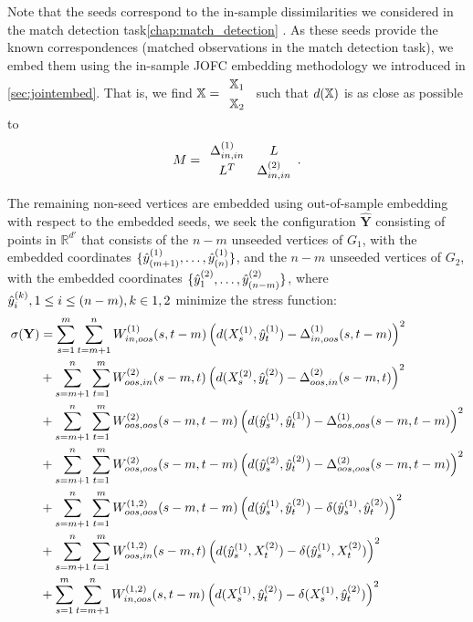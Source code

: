 \documentclass[12pt,oneside,final]{thesis}\usepackage[]{graphicx}\usepackage[]{color}
\begin{document}
Note that the seeds correspond to the in-sample dissimilarities we considered in the match detection task\ref{chap:match_detection} . As these seeds provide the known correspondences (matched observations in the match detection task), we embed them using the in-sample JOFC embedding methodology we introduced in \ref{sec:jointembed}. That is, we find $\X= \begin{array}{c}
\X_1 \\
\X_2
\end{array}$ such that $d(\mathbb{X})$ is as close as possible to $$M= \begin{array}{cc}
\gD^{(1)}_{in,in} & L \\
 L^T &\gD^{(2)}_{in,in}
\end{array} . $$

The remaining non-seed vertices are embedded using out-of-sample embedding with respect to the embedded seeds, \ie we seek the configuration ${ \hat{\mathbf{Y}}}$ consisting of points in $\mathbb{R}^{d'}$ that consists of the $n-m$ unseeded vertices of $G_1$, with the embedded coordinates  $\{\hat{y}^{(1)}_{(m+1)},\ldots,\hat{y}^{(1)}_{(n)}\}$, and the $n-m$ unseeded vertices of $G_2$, with the embedded coordinates  $\{\hat{y}^{(2)}_1,\ldots,\hat{y}^{(2)}_{(n-m)}\}$, where $\yhat_{i}^{(k)}, \onespace 1\leq i \leq (n-m), k \in {1,2}$  minimize the stress function:
\begin{align}
\sigma({\bf Y})&=\sum_{s=1}^{m}\sum_{t=m+1}^{n} {W^{(1)}_{in,oos}(s,t-m)  \left(d(X^{(1)}_{s},\hat{y}_t^{(1)})-{\Delta}^{(1)}_{in,oos}(s,t-m)\right)^2 } \label{eq:oos}\\
&+\sum_{s=m+1}^{n}\sum_{t=1}^{m}
{W^{(2)}_{oos,in}(s-m,t)  \left(d(X^{(2)}_{s},\hat{y}_t^{(2)})-{\Delta}^{(2)}_{oos,in}(s-m,t)\right)^2}  \label{eq:oos2}\\
&+\sum_{s=m+1}^{n}\sum_{t=1}^{m} 
{W^{(2)}_{oos,oos}(s-m,t-m) \left(d(\hat{y}_s^{(1)},\hat{y}_t^{(1)})-{\Delta}^{(1)}_{oos,oos}(s-m,t-m)\right)^2} \label{eq:oos3}\\
&+\sum_{s=m+1}^{n}\sum_{t=1}^{m} 
{W^{(2)}_{oos,oos}(s-m,t-m) \left(d(\hat{y}_s^{(2)},\hat{y}_t^{(2)})-{\Delta}^{(2)}_{oos,oos}(s-m,t-m)\right)^2} \label{eq:oos4} \\
&+\sum_{s=m+1}^{n} \sum_{t=1}^{m}
W^{(1,2)}_{oos,oos}(s-m,t-m) \left(d(\hat{y}_s^{(1)},\hat{y}_t^{(2)})-\delta(\hat{y}_s^{(1)},\hat{y}_t^{(2)})\right)^2 \label{eq:oos5}\\
&+\sum_{s=m+1}^{n} \sum_{t=1}^{m}
W^{(1,2)}_{oos,in}(s-m,t) \left(d(\hat{y}_s^{(1)},X^{(2)}_{t})-\delta(\hat{y}_s^{(1)},X^{(2)}_{t})\right)^2 \label{eq:oos6}\\
&+\sum_{s=1}^{m} \sum_{t=m+1}^{n}
W^{(1,2)}_{in,oos}(s,t-m) \left(d(X^{(1)}_{s},\hat{y}_t^{(2)})-\delta(X^{(1)}_{s},\hat{y}_t^{(2)})\right)^2 \label{eq:oos7}
\end{align}
\end{document}
